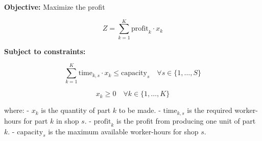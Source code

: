 \documentclass{article}
\begin{document}
\textbf{Objective:} Maximize the profit

\[
Z = \sum_{k=1}^{K} \text{profit}_{k} \cdot x_k
\]

\textbf{Subject to constraints:}

\[
\sum_{k=1}^{K} \text{time}_{k, s} \cdot x_k \leq \text{capacity}_{s} \quad \forall s \in \{1, \ldots, S\}
\]

\[
x_k \geq 0 \quad \forall k \in \{1, \ldots, K\}
\]

where:
- \( x_k \) is the quantity of part \( k \) to be made.
- \( \text{time}_{k, s} \) is the required worker-hours for part \( k \) in shop \( s \).
- \( \text{profit}_{k} \) is the profit from producing one unit of part \( k \).
- \( \text{capacity}_{s} \) is the maximum available worker-hours for shop \( s \).
\end{document}
